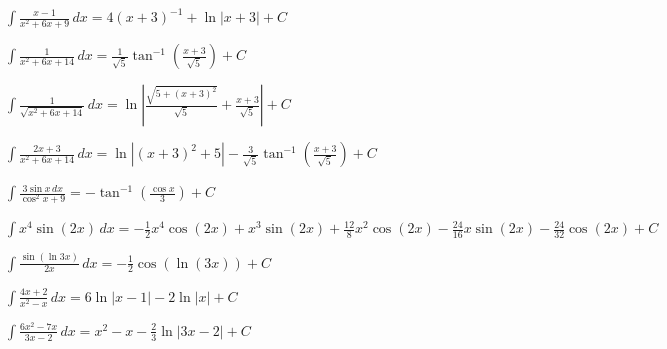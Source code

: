 \documentclass[12pt]{exam}
\begin{document}
\begin{questions}
\question $\displaystyle \int  \frac{x-1}{x^2+6x+9} \, dx= 4(x+3)^{-1}+\ln|x+3|+C$
\vspace{.35in}

\question $\displaystyle \int  \frac{1}{x^2+6x +14} \, dx = 
\frac{1}{\sqrt{5}} \tan^{-1}\left(\frac{x+3}{\sqrt{5}}\right)+C$
\vspace{.25in}

\question $\displaystyle \int \frac{1}{\sqrt{x^2+6x+14}}  \, dx =
\ln\left|\frac{{\sqrt{5+(x+3)^2}}}{\sqrt{5}}+\frac{x+3}{\sqrt{5}}\right|+C  $
\vspace{.25in}

\question $\displaystyle \int \frac {2x+3}{x^2+6x +14}   \, dx
=\ln|(x+3)^2+5| -\frac{3}{\sqrt{5}}\tan^{-1}\left(\frac{x+3}{\sqrt{5}}\right)+C$
\vspace{.35in}

\question $\displaystyle \int \frac{3\sin x \, dx}{\cos^2 x + 9} =-\tan^{-1}
\left(\frac{\cos x}{3}\right) +C$
\vspace{.35in}

\question $\displaystyle \int  x^4 \sin(2x) \, dx
= -\frac{1}{2}x^4 \cos(2x) +x^3\sin(2x) +\frac{12}{8}x^2\cos(2x)
-\frac{24}{16}x\sin(2x) -\frac{24}{32} \cos(2x)+C$
\vspace{.35in}

\question $\displaystyle \int   \frac{\sin(\ln 3x)}{2x} \, dx
=-\frac{1}{2}\cos(\ln(3x)) + C$
\vspace{.35in}

\question $\displaystyle \int   \frac{4x+2}{x^2-x} \, dx
= 6\ln|x-1| - 2 \ln |x|+C$
\vspace{.35in}

\question $\displaystyle \int   \frac{6x^2-7x}{3x-2} \, dx
=x^2 - x -\frac{2}{3}\ln|3x-2|+C$
\vspace{.35in}



\end{questions}
\end{document}
